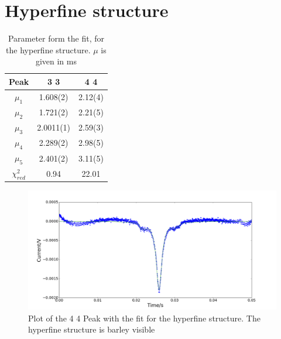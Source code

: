 \section{Hyperfine structure}
\label{sec:hf_anhang}


\begin{table}[H]
\centering
\caption{Parameter form the fit, for the hyperfine structure. $\mu$ is given in ms}
\label{tab:hf_6_6_data}
\begin{tabular}{c|c|c}
 Peak & 3 3 & 4 4 \\ \hline
$\mu_1$ &		1.608(2)  	&  	2.12(4)	\\ 
$\mu_2$ &  		1.721(2)	&  	2.21(5)	\\ 
$\mu_3$ &  		2.0011(1)	&  	2.59(3)	\\ 
$\mu_4$ &  		2.289(2)	&  	2.98(5)	\\ 
$\mu_5$ &  		2.401(2)	& 	3.11(5)	\\ 
$\chi^2_{red}$ & 0.94		& 	22.01	\\
\end{tabular} 
\end{table}



\begin{figure}[H]
\centering
\includegraphics[scale = 0.39]{hf_4_4.png}
\caption{Plot of the 4 4 Peak with the fit for the hyperfine structure. The hyperfine structure is barley visible}
\label{fig:hf_4_4} 
\end{figure}

